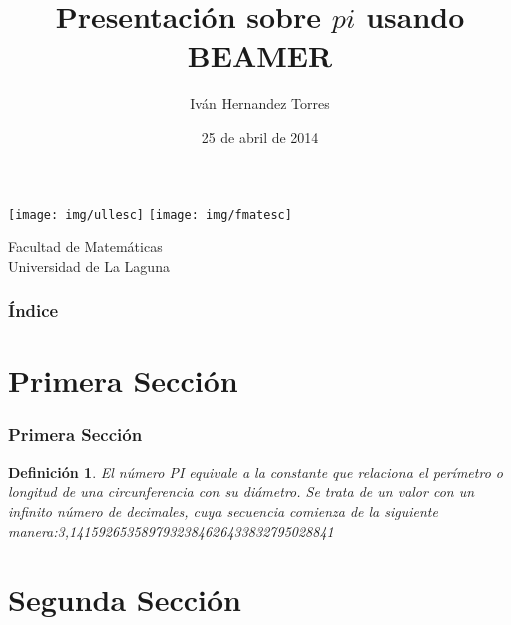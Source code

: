 \documentclass{beamer}
\title[Presentación con Beamer]{Presentación sobre $pi$ usando BEAMER}
\author[Iván]{Iván Hernandez Torres}
\date[25-04-2014]{25 de abril de 2014}
\newtheorem{definicion}{Definición}
\begin{document}
  
\begin{frame}

  \texttt{[image: img/ullesc]}
  \hspace*{7.0cm}
  \texttt{[image: img/fmatesc]}
  \titlepage

  \begin{small}
    \begin{center}
     Facultad de Matemáticas \\
     Universidad de La Laguna
    \end{center}
  \end{small}

\end{frame}

\begin{frame}
  \frametitle{Índice}
  \tableofcontents[pausesections]
\end{frame}


\section{Primera Sección}


\begin{frame}

\frametitle{Primera Sección}

\begin{definicion}
El número PI equivale a la constante que relaciona el perímetro o longitud de una
circunferencia con su diámetro. Se trata de un valor con un infinito número de decimales, cuya secuencia comienza de
la siguiente manera:3,1415926535897932384626433832795028841

\end{definicion}

\end{frame}

\section{Segunda Sección}
\end{document}
